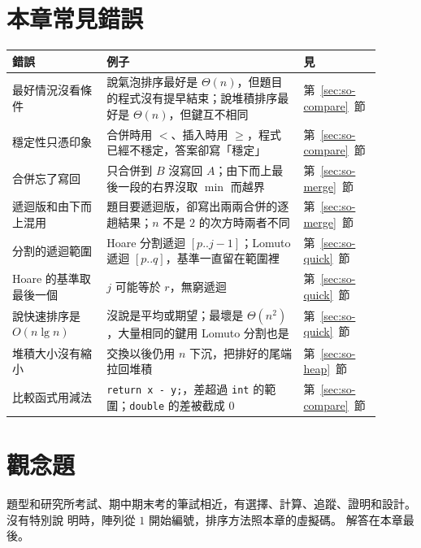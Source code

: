 \section{本章常見錯誤}
\label{sec:so-pitfalls}

\begin{center}
\small
\begin{tabular}{p{0.24\linewidth}p{0.50\linewidth}p{0.16\linewidth}}
\toprule
錯誤 & 例子 & 見 \\
\midrule
最好情況沒看條件 & 說氣泡排序最好是 $\Theta(n)$，但題目的程式沒有提早結束；說堆積排序最好是
$\Theta(n)$，但鍵互不相同 & 第~\ref{sec:so-compare}~節 \\
穩定性只憑印象 & 合併時用 $<$、插入時用 $\ge$，程式已經不穩定，答案卻寫「穩定」 &
第~\ref{sec:so-compare}~節 \\
合併忘了寫回 & 只合併到 $B$ 沒寫回 $A$；由下而上最後一段的右界沒取 $\min$ 而越界 &
第~\ref{sec:so-merge}~節 \\
遞迴版和由下而上混用 & 題目要遞迴版，卻寫出兩兩合併的逐趟結果；$n$ 不是 $2$ 的次方時兩者不同 &
第~\ref{sec:so-merge}~節 \\
分割的遞迴範圍 & Hoare 分割遞迴 $[p..j-1]$；Lomuto 遞迴 $[p..q]$，基準一直留在範圍裡 &
第~\ref{sec:so-quick}~節 \\
Hoare 的基準取最後一個 & $j$ 可能等於 $r$，無窮遞迴 & 第~\ref{sec:so-quick}~節 \\
說快速排序是 $O(n \lg n)$ & 沒說是平均或期望；最壞是 $\Theta(n^2)$，大量相同的鍵用 Lomuto 分割也是 & 第~\ref{sec:so-quick}~節 \\
堆積大小沒有縮小 & 交換以後仍用 $n$ 下沉，把排好的尾端拉回堆積 & 第~\ref{sec:so-heap}~節 \\
比較函式用減法 & \texttt{return x - y;}，差超過 \texttt{int} 的範圍；\texttt{double} 的差被截成
$0$ & 第~\ref{sec:so-compare}~節 \\
\bottomrule
\end{tabular}
\end{center}

\section{觀念題}
\label{sec:so-exercises}

題型和研究所考試、期中期末考的筆試相近，有選擇、計算、追蹤、證明和設計。 沒有特別說
明時，陣列從 $1$ 開始編號，排序方法照本章的虛擬碼。 解答在本章最後。

